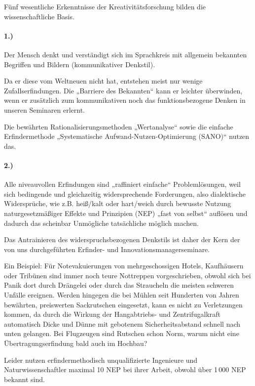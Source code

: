 \documentclass[11pt,a4paper]{article}
\begin{document}
Fünf wesentliche Erkenntnisse der Kreativitätsforschung bilden die
wissenschaftliche Basis.

\paragraph{1.)}
Der Mensch denkt und verständigt sich im Sprachkreis mit allgemein bekannten
Begriffen und Bildern (kommunikativer Denkstil).

Da er diese vom Weltneuen nicht hat, entstehen meist nur wenige
Zufallserfindungen. Die „Barriere des Bekannten“ kann er leichter überwinden,
wenn er zusätzlich zum kommunikativen noch das funktionsbezogene Denken in
unseren Seminaren erlernt.

Die bewährten Rationalisierungsmethoden „Wertanalyse“ sowie die einfache
Erfindermethode „Systematische Aufwand-Nutzen-Optimierung (SANO)“ nutzen das.

\paragraph{2.)}
Alle niveauvollen Erfindungen sind „raffiniert einfache“ Problemlösungen, weil
sich bedingende und gleichzeitig widersprechende Forderungen, also
dialektische Widersprüche, wie z.B. heiß/kalt oder hart/weich durch bewusste
Nutzung naturgesetzmäßiger Effekte und Prinzipien (NEP) „fast von selbst“
auflösen und dadurch das scheinbar Unmögliche tatsächliche möglich machen.

Das Antrainieren des widerspruchsbezogenen Denkstils ist daher der Kern der
von uns durchgeführten Erfinder- und Innovationsmanagerseminare.

Ein Beispiel: Für Notevakuierungen von mehrgeschossigen Hotels, Kaufhäusern
oder Tribünen sind immer noch teure Nottreppen vorgeschrieben, obwohl sich bei
Panik dort durch Drängelei oder durch das Straucheln die meisten schweren
Unfälle ereignen. Werden hingegen die bei Mühlen seit Hunderten von Jahren
bewährten, preiswerten Sackrutschen eingesetzt, kann es nicht zu Verletzungen
kommen, da durch die Wirkung der Hangabtriebs- und Zentrifugalkraft
automatisch Dicke und Dünne mit gebotenem Sicherheitsabstand schnell nach
unten gelangen. Bei Flugzeugen sind Rutschen schon Norm, warum nicht eine
Übertragungserfindung bald auch im Hochbau?

Leider nutzen erfindermethodisch unqualifizierte Ingenieure und
Naturwissenschaftler maximal 10 NEP bei ihrer Arbeit, obwohl über 1\,000 NEP
bekannt sind.
\end{document}
